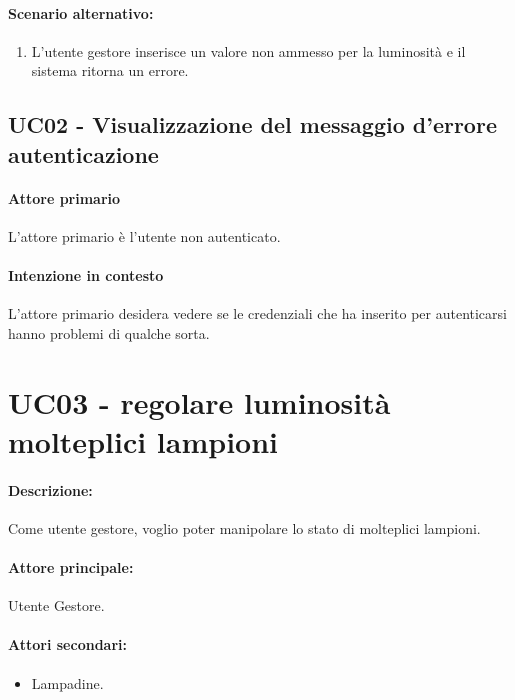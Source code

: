 \paragraph{Scenario alternativo:}
\begin{enumerate}
    \item L'utente gestore inserisce un valore non ammesso per la luminosità e il sistema ritorna un errore.
\end{enumerate}


\subsection{UC02 - Visualizzazione del messaggio d'errore autenticazione}

\paragraph{Attore primario} L'attore primario è l'utente non autenticato.

\paragraph{Intenzione in contesto} L'attore primario desidera vedere se le credenziali che ha inserito per autenticarsi hanno problemi di qualche sorta.

\section{UC03 - regolare luminosità molteplici lampioni}

\paragraph{Descrizione:}
Come utente gestore, voglio poter manipolare lo stato di molteplici lampioni.

\paragraph{Attore principale:}

Utente Gestore.

\paragraph{Attori secondari:}
\begin{itemize}
    \item Lampadine.
\end{itemize}

